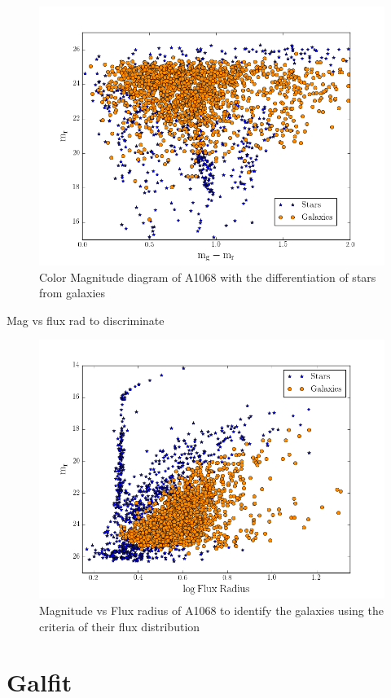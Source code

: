\begin{figure}[H]
\centering
\includegraphics[width=12cm]{images/color_mag.png}
\caption[Color Magnitude diagram of A1068]{Color Magnitude diagram of A1068 with the differentiation of stars from galaxies}
\end{figure}

Mag vs flux rad to discriminate

\begin{figure}[H]
\centering
\includegraphics[width=12cm]{images/mag_vs_flux_rad.png}
\caption[Magnitude vs Flux radius of A1068]{Magnitude vs Flux radius of A1068 to identify the galaxies using the criteria of their flux distribution}
\end{figure}

\section{Galfit}

